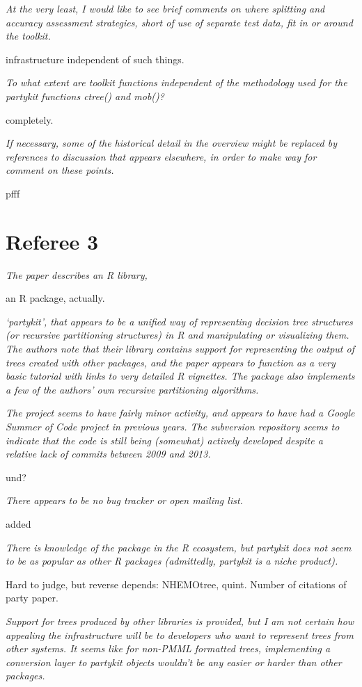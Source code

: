\documentclass{article}
\begin{document}
\textit{
At the very least, I would like to see brief comments on where splitting and
accuracy assessment strategies, short of use of separate test data, fit in
or around the toolkit.}  

infrastructure independent of such things.

\textit{To what extent are toolkit functions independent of
the methodology used for the partykit functions ctree() and mob()?}

completely.

\textit{If
necessary, some of the historical detail in the overview might be replaced
by references to discussion that appears elsewhere, in order to make way for
comment on these points.}

pfff

\section*{Referee 3}

\textit{
The paper describes an R library,}

an R package, actually.

\textit{ `partykit', that appears to be a unified
way of representing decision tree structures (or recursive partitioning
structures) in R and manipulating or visualizing them.  The authors note
that their library contains support for representing the output of trees
created with other packages, and the paper appears to function as a very
basic tutorial with links to very detailed R vignettes.  The package also
implements a few of the authors' own recursive partitioning algorithms.}

\textit{
The project seems to have fairly minor activity, and appears to have had a
Google Summer of Code project in previous years.  The subversion repository
seems to indicate that the code is still being (somewhat) actively developed
despite a relative lack of commits between 2009 and 2013.}

und?

\textit{There appears to
be no bug tracker or open mailing list.}

added

\textit{There is knowledge of the package
in the R ecosystem, but partykit does not seem to be as popular as other R
packages (admittedly, partykit is a niche product).}

Hard to judge, but reverse depends: NHEMOtree, quint. Number of citations of party paper.

\textit{
Support for trees produced by other libraries is provided, but I am not
certain how appealing the infrastructure will be to developers who want to
represent trees from other systems.  It seems like for non-PMML formatted
trees, implementing a conversion layer to partykit objects wouldn't be any
easier or harder than other packages.}
\end{document}
